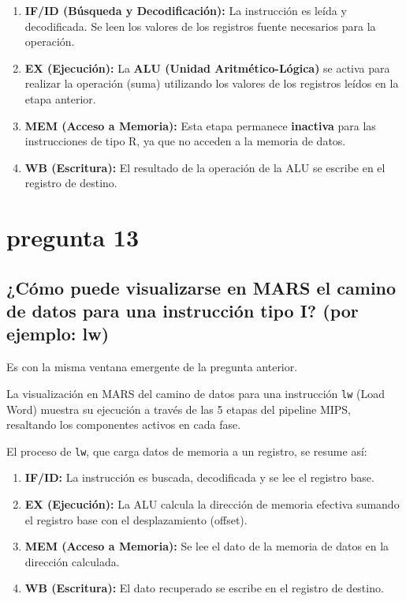 \documentclass{article}
\begin{document}
\begin{enumerate}
\item \textbf{IF/ID (Búsqueda y Decodificación):} La instrucción es leída y decodificada. Se leen los valores de los registros fuente necesarios para la operación.
\item \textbf{EX (Ejecución):} La \textbf{ALU (Unidad Aritmético-Lógica)} se activa para realizar la operación (suma) utilizando los valores de los registros leídos en la etapa anterior.
\item \textbf{MEM (Acceso a Memoria):} Esta etapa permanece \textbf{inactiva} para las instrucciones de tipo R, ya que no acceden a la memoria de datos.
\item \textbf{WB (Escritura):} El resultado de la operación de la ALU se escribe en el registro de destino.
\end{enumerate}

\section*{pregunta 13}
\subsection*{¿Cómo puede visualizarse en MARS el camino de datos para una instrucción tipo I? (por ejemplo: lw)}

Es con la misma ventana emergente de la pregunta anterior.

La visualización en MARS del camino de datos para una instrucción \texttt{lw} (Load Word) muestra su ejecución a través de las 5 etapas del pipeline MIPS, resaltando los componentes activos en cada fase.

El proceso de \texttt{lw}, que carga datos de memoria a un registro, se resume así:

\begin{enumerate}
\item \textbf{IF/ID:} La instrucción es buscada, decodificada y se lee el registro base.
\item \textbf{EX (Ejecución):} La ALU calcula la dirección de memoria efectiva sumando el registro base con el desplazamiento (offset).
\item \textbf{MEM (Acceso a Memoria):} Se lee el dato de la memoria de datos en la dirección calculada.
\item \textbf{WB (Escritura):} El dato recuperado se escribe en el registro de destino.
\end{enumerate}
\end{document}
